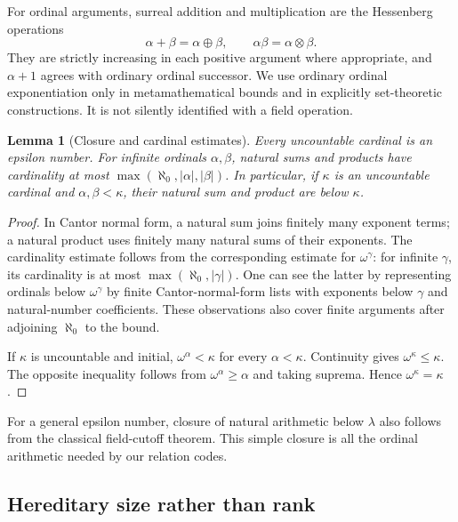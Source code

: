 \documentclass[11pt,letterpaper]{article}
\newtheorem{lemma}[theorem]{Lemma}
\theoremstyle{definition}
\theoremstyle{remark}
\newcommand{\nsum}{\mathbin{\oplus}}
\newcommand{\nprod}{\mathbin{\otimes}}
\newcommand{\card}[1]{\lvert#1\rvert}
\begin{document}
For ordinal arguments, surreal addition and multiplication are the
Hessenberg operations
\[
 \alpha+\beta=\alpha\nsum\beta,\qquad
 \alpha\beta=\alpha\nprod\beta.
\]
They are strictly increasing in each positive argument where appropriate,
and $\alpha+1$ agrees with ordinary ordinal successor. We use ordinary
ordinal exponentiation only in metamathematical bounds and in explicitly
set-theoretic constructions. It is not silently identified with a field
operation.

\begin{lemma}[Closure and cardinal estimates]
\label{lem:card-estimates}
Every uncountable cardinal is an epsilon number. For infinite ordinals
$\alpha,\beta$, natural sums and products have cardinality at most
$\max(\aleph_0,\card\alpha,\card\beta)$. In particular, if $\kappa$ is an
uncountable cardinal and $\alpha,\beta<\kappa$, their natural sum and product
are below $\kappa$.
\end{lemma}
\begin{proof}
In Cantor normal form, a natural sum joins finitely many exponent terms; a
natural product uses finitely many natural sums of their exponents. The
cardinality estimate follows from the corresponding estimate for
$\omega^\gamma$: for infinite $\gamma$, its cardinality is at most
$\max(\aleph_0,\card\gamma)$. One can see the latter by representing ordinals
below $\omega^\gamma$ by finite Cantor-normal-form lists with exponents below
$\gamma$ and natural-number coefficients. These observations also cover
finite arguments after adjoining $\aleph_0$ to the bound.

If $\kappa$ is uncountable and initial, $\omega^\alpha<\kappa$ for every
$\alpha<\kappa$. Continuity gives $\omega^\kappa\le\kappa$. The opposite
inequality follows from $\omega^\alpha\ge\alpha$ and taking suprema. Hence
$\omega^\kappa=\kappa$.
\end{proof}

For a general epsilon number, closure of natural arithmetic below $\lambda$
also follows from the classical field-cutoff theorem. This simple closure is
all the ordinal arithmetic needed by our relation codes.

\subsection{Hereditary size rather than rank}
\end{document}
